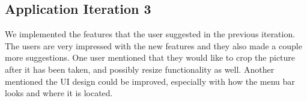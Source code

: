 \documentclass[a4wide, 11pt]{article}
\begin{document}

\subsection{Application Iteration 3}
We implemented the features that the user suggested in the previous iteration. The users are very impressed with the new features and they also made a couple more suggestions. One user mentioned that they would like to crop the picture after it has been taken, and possibly resize functionality as well. Another mentioned the UI design could be improved, especially with how the menu bar looks and where it is located.


\end{document}
